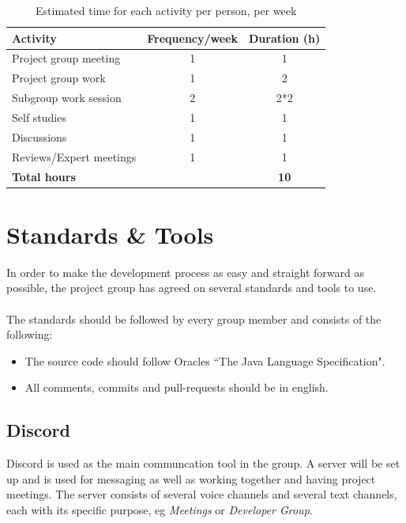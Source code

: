 \documentclass{article}
\begin{document}
        \begin{table}[h]
            \centering
            \begin{tabular}{|l|c|c|}
                \hline
                    \textbf{Activity} & \textbf{Frequency/week} & \textbf{Duration (h)} \\
                \hline
                    Project group meeting & 1 & 1 \\
                 \hline
                    Project group work & 1 & 2 \\
                 \hline
                    Subgroup work session & 2 & 2*2 \\
                 \hline
                    Self studies & 1  & 1 \\
                 \hline
                    Discussions & 1 & 1 \\
                 \hline
                    Reviews/Expert meetings & 1 & 1 \\
                 \hline
                    \textbf{Total hours} & & \textbf{10} \\
                 \hline
            \end{tabular}
            \caption{Estimated time for each activity per person, per week}
            \label{activitytable}
        \end{table}
    

\section{Standards \& Tools}    %
    In order to make the development process as easy and straight forward as possible,
    the project group has agreed on several standards and tools to use. 
    \\ \\
    The standards should be followed by every group member and consists of the following:
    \begin{itemize}
        \item The source code should follow Oracles ``The Java Language Specification".
        \item All comments, commits and pull-requests should be in english.
    \end{itemize}
    
    \subsection{Discord}
    Discord is used as the main communcation tool in the group. A server will be set up and is
    used for messaging as well as working together and having project meetings.
    The server consists of several voice channels and several text channels, each
    with its specific purpose, eg \textit{Meetings} or \textit{Developer Group}.
    
\end{document}
